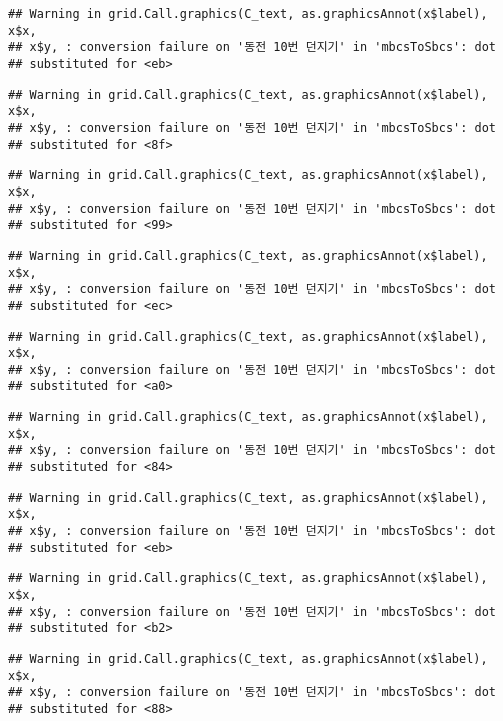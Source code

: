 \documentclass[]{book}
\begin{document}
\begin{verbatim}
## Warning in grid.Call.graphics(C_text, as.graphicsAnnot(x$label), x$x,
## x$y, : conversion failure on '동전 10번 던지기' in 'mbcsToSbcs': dot
## substituted for <eb>
\end{verbatim}

\begin{verbatim}
## Warning in grid.Call.graphics(C_text, as.graphicsAnnot(x$label), x$x,
## x$y, : conversion failure on '동전 10번 던지기' in 'mbcsToSbcs': dot
## substituted for <8f>
\end{verbatim}

\begin{verbatim}
## Warning in grid.Call.graphics(C_text, as.graphicsAnnot(x$label), x$x,
## x$y, : conversion failure on '동전 10번 던지기' in 'mbcsToSbcs': dot
## substituted for <99>
\end{verbatim}

\begin{verbatim}
## Warning in grid.Call.graphics(C_text, as.graphicsAnnot(x$label), x$x,
## x$y, : conversion failure on '동전 10번 던지기' in 'mbcsToSbcs': dot
## substituted for <ec>
\end{verbatim}

\begin{verbatim}
## Warning in grid.Call.graphics(C_text, as.graphicsAnnot(x$label), x$x,
## x$y, : conversion failure on '동전 10번 던지기' in 'mbcsToSbcs': dot
## substituted for <a0>
\end{verbatim}

\begin{verbatim}
## Warning in grid.Call.graphics(C_text, as.graphicsAnnot(x$label), x$x,
## x$y, : conversion failure on '동전 10번 던지기' in 'mbcsToSbcs': dot
## substituted for <84>
\end{verbatim}

\begin{verbatim}
## Warning in grid.Call.graphics(C_text, as.graphicsAnnot(x$label), x$x,
## x$y, : conversion failure on '동전 10번 던지기' in 'mbcsToSbcs': dot
## substituted for <eb>
\end{verbatim}

\begin{verbatim}
## Warning in grid.Call.graphics(C_text, as.graphicsAnnot(x$label), x$x,
## x$y, : conversion failure on '동전 10번 던지기' in 'mbcsToSbcs': dot
## substituted for <b2>
\end{verbatim}

\begin{verbatim}
## Warning in grid.Call.graphics(C_text, as.graphicsAnnot(x$label), x$x,
## x$y, : conversion failure on '동전 10번 던지기' in 'mbcsToSbcs': dot
## substituted for <88>
\end{verbatim}
\end{document}
